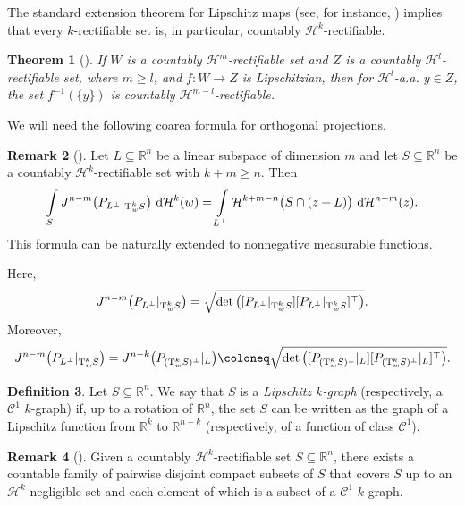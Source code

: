 \documentclass[pdflatex,sn-mathphys-num]{sn-jnl}
\theoremstyle{plain}
\newtheorem{theorem}{Theorem}[section]
\theoremstyle{definition}
\newtheorem{definition}[theorem]{Definition}
\newtheorem{rem}[theorem]{Remark}
\newcommand{\dH}[1]{\,\mathrm d\mathcal{H}^{#1}}
\begin{document}
 
The standard extension theorem for Lipschitz maps (see, for instance, \cite[Theorem~2.10.43]{federer}) implies that every $k$-rectifiable set is, in particular, countably $\mathcal{H}^k$-rectifiable. 

\begin{theorem}[]\label{rezy}
    If $W$ is a countably $\mathcal{H}^{m}$-rectifiable set and $Z$ is a countably $\mathcal{H}^{l}$-rectifiable set, where $m\geq l$, and $f\colon W\to Z$ is Lipschitzian, then for $\mathcal{H}^l$-a.a. $y\in Z$, the set $f^{-1}(\{y\})$ is countably $\mathcal{H}^{m-l}$-rectifiable.
\end{theorem}
We will need the following coarea formula for orthogonal projections.

\begin{rem}[]
Let $L\subseteq\mathbb{R}^n$ be a linear subspace of dimension $m$ and let
$S\subseteq\mathbb{R}^n$ be a countably $\mathcal{H}^k$-rectifiable set with
$k+m\geq n$. Then
\[
\int\limits_{S} J^{n-m}\big(P_{L^{\perp}}|_{\textup{T}^k_w S}\big)\,\dH{k}(w)
=
\int\limits_{L^{\perp}}
\mathcal{H}^{k+m-n}\big(S\cap(z+L)\big)\,\dH{n-m}(z).
\] This formula can be naturally extended to nonnegative measurable functions.

Here, $$J^{n-m}\big(P_{L^{\perp}}|_{\textup{T}^k_w S}\big)=\sqrt{\det\big([P_{L^{\perp}}|_{\textup{T}^k_w S}][P_{L^{\perp}}|_{\textup{T}^k_w S}]^{\top}\big)}.$$
Moreover,
\[
J^{n-m}\big(P_{L^{\perp}}|_{\textup{T}^k_w S}\big)
=J^{n-k}\big(P_{(\textup{T}^{k}_w S)^{\perp}}|_L\big)\coloneq \sqrt{\det\big([P_{(\textup{T}^{k}_w S)^{\perp}}|_L][P_{(\textup{T}^{k}_w S)^{\perp}}|_L]^{\top}\big)}
.
\]

\end{rem}
 
 \begin{definition}
Let $S \subseteq \mathbb{R}^n$. We say that $S$ is a \emph{Lipschitz $k$-graph} (respectively, a $\mathcal{C}^1$ $k$-graph) if, up to a rotation of $\mathbb{R}^n$, the set $S$ can be written as the graph of a Lipschitz function from $\mathbb{R}^k$ to $\mathbb{R}^{n-k}$ (respectively, of a function of class $\mathcal{C}^1$).
\end{definition}

\begin{rem}[]\label{remark}
    Given a countably $\mathcal{H}^{k}$-rectifiable set $S\subseteq\mathbb{R}^n$, there exists a countable family of pairwise disjoint compact subsets of $S$ that covers $S$ up to an $\mathcal{H}^{k}$-negligible set and each element of which is a subset of a $\mathcal{C}^1$ $k$-graph.
\end{rem}
\end{document}
